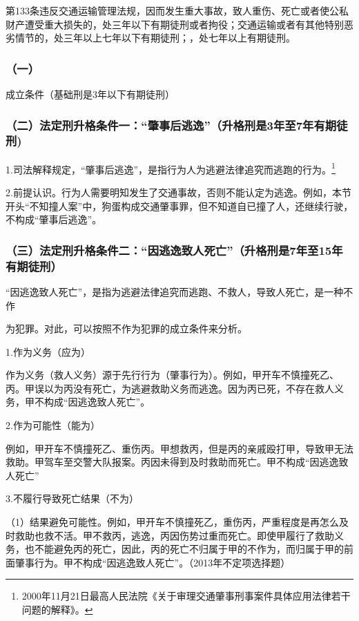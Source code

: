 第133条违反交通运输管理法规，因而发生重大事故，致人重伤、死亡或者使公私财产遭受重大损失的，处三年以下有期徒刑或者拘役；交通运输或者有其他特别恶劣情节的，处三年以上七年以下有期徒刑；，处七年以上有期徒刑。

\subsubsection*{（一）}

成立条件（基础刑是3年以下有期徒刑）


\subsubsection*{（二）法定刑升格条件一：“肇事后逃逸”（升格刑是3年至7年有期徒刑)}

1.司法解释规定，“肇事后逃逸”，是指行为人为逃避法律追究而逃跑的行为。\footnote{2000年11月21日最高人民法院《关于审理交通肇事刑事案件具体应用法律若干问题的解释》。}

2.前提认识。行为人需要明知发生了交通事故，否则不能认定为逃逸。例如，本节开头“不知撞人案”中，狗蛋构成交通肇事罪，但不知道自已撞了人，还继续行驶，不构成“肇事后逃逸”。

\subsubsection*{（三）法定刑升格条件二：“因逃逸致人死亡”（升格刑是7年至15年有期徒刑）}

“因逃逸致人死亡”，是指为逃避法律追究而逃跑、不救人，导致人死亡，是一种不作

为犯罪。对此，可以按照不作为犯罪的成立条件来分析。

1.作为义务（应为）

作为义务（救人义务）源于先行行为（肇事行为）。例如，甲开车不慎撞死乙、丙。甲误以为丙没有死亡，为逃避救助义务而逃逸。因为丙已死，不存在救人义务，甲不构成“因逃逸致人死亡”。

2.作为可能性（能为）

例如，甲开车不慎撞死乙、重伤丙。甲想救丙，但是丙的亲戚殴打甲，导致甲无法救助。甲驾车至交警大队报案。丙因未得到及时救助而死亡。甲不构成“因逃逸致人死亡”

3.不履行导致死亡结果（不为）

（1）结果避免可能性。例如，甲开车不慎撞死乙，重伤丙，严重程度是再怎么及时救助也救不活。甲不救丙，逃逸，丙因伤势过重而死亡。即使甲履行了救助义务，也不能避免丙的死亡，因此，丙的死亡不归属于甲的不作为，而归属于甲的前面肇事行为。甲不构成“因逃逸致人死亡”。（2013年不定项选择题）

